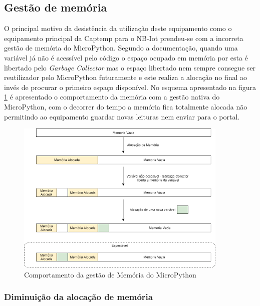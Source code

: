 \subsection {Gestão de memória}

\par O principal motivo da desistência da utilização deste equipamento como o equipamento principal da Captemp para o NB-Iot prendeu-se com a incorreta gestão de memória do MicroPython. Segundo a documentação, quando uma variável já não é acessível pelo código o espaço ocupado em memória por esta é libertado pelo \textit{Garbage Collector} mas o espaço libertado nem sempre consegue ser reutilizador pelo MicroPython futuramente e este realiza a alocação no final ao invés de procurar o primeiro espaço disponível. No esquema apresentado na figura \ref{memo} é apresentado o comportamento da memória com a gestão nativa do MicroPython, com o decorrer do tempo a memória fica totalmente alocada não permitindo ao equipamento guardar novas leituras nem enviar para o portal.


\begin{figure}[ht]
\centering
\includegraphics[width=0.90\textwidth]{images/memo.png}
\caption{Comportamento da gestão de Memória do MicroPython}\label{memo}
\end{figure}



\subsubsection {Diminuição da alocação de memória}

